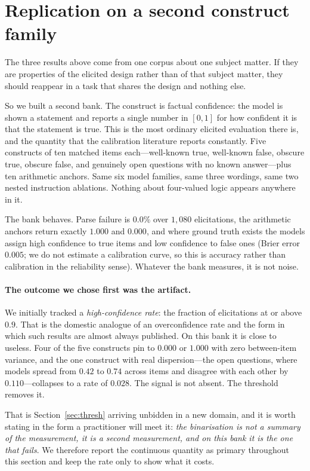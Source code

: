 \section{Replication on a second construct family}
\label{sec:replication}

The three results above come from one corpus about one subject matter. If they are properties of
the elicited design rather than of that subject matter, they should reappear in a task that
shares the design and nothing else.

So we built a second bank. The construct is factual confidence: the model is shown a statement
and reports a single number in $[0,1]$ for how confident it is that the statement is true. This
is the most ordinary elicited evaluation there is, and the quantity that the calibration
literature reports constantly. Five constructs of ten matched items each---well-known true,
well-known false, obscure true, obscure false, and genuinely open questions with no known
answer---plus ten arithmetic anchors. Same six model families, same three wordings, same two
nested instruction ablations. Nothing about four-valued logic appears anywhere in it.

The bank behaves. Parse failure is $0.0\%$ over $1{,}080$ elicitations, the arithmetic anchors
return exactly $1.000$ and $0.000$, and where ground truth exists the models assign high confidence to
true items and low confidence to false ones (Brier error $0.005$; we do not estimate a
calibration curve, so this is accuracy rather than calibration in the reliability sense). Whatever the bank measures, it is not noise.

\paragraph{The outcome we chose first was the artifact.} We initially tracked a
\emph{high-confidence rate}: the fraction of elicitations at or above $0.9$. That is the
domestic analogue of an overconfidence rate and the form in which such results are almost always
published. On this bank it is close to useless. Four of the five constructs pin to $0.000$ or
$1.000$ with zero between-item variance, and the one construct with real dispersion---the open
questions, where models spread from $0.42$ to $0.74$ across items and disagree with each other by
$0.110$---collapses to a rate of $0.028$. The signal is not absent. The threshold removes it.

That is Section~\ref{sec:thresh} arriving unbidden in a new domain, and it is worth stating in the
form a practitioner will meet it: \emph{the binarisation is not a summary of the measurement, it
is a second measurement, and on this bank it is the one that fails}. We therefore report the
continuous quantity as primary throughout this section and keep the rate only to show what it
costs.

